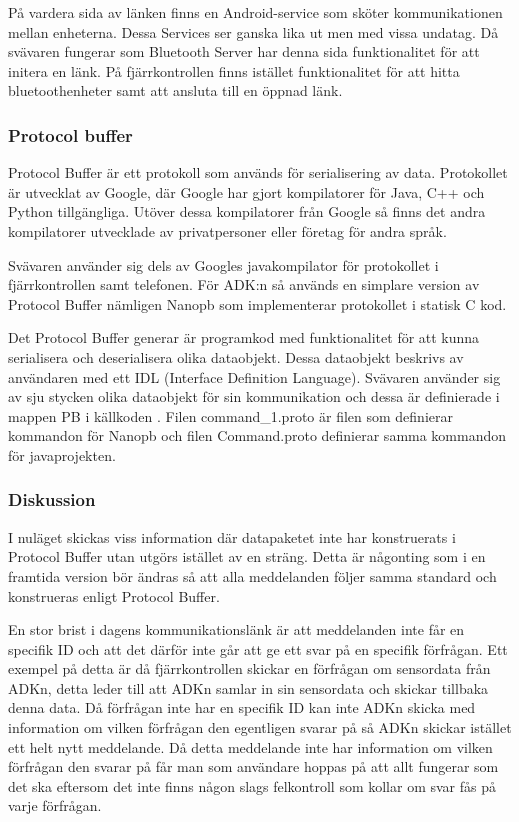 På vardera sida av länken finns en Android-service som sköter kommunikationen
mellan enheterna. Dessa Services ser ganska lika ut men med vissa undatag. Då
svävaren fungerar som Bluetooth Server har denna sida funktionalitet för att
initera en länk. På fjärrkontrollen finns istället funktionalitet för att hitta
bluetoothenheter samt att ansluta till en öppnad länk.


\subsubsection{Protocol buffer}
\label{komlank:ProtocolBuffer}
Protocol Buffer\cite{Protocol buffer} är ett protokoll som används för
serialisering av data.
Protokollet är utvecklat av Google, där Google har gjort kompilatorer för Java,
C++ och Python tillgängliga. Utöver dessa kompilatorer från Google så finns det
andra kompilatorer utvecklade av privatpersoner eller företag för andra språk.

Svävaren använder sig dels av Googles javakompilator för protokollet i 
fjärrkontrollen samt telefonen. För ADK:n så används en simplare version av
Protocol Buffer nämligen Nanopb \cite{Nanopb} som implementerar protokollet i
statisk C kod.

Det Protocol Buffer generar är programkod med funktionalitet för att kunna
serialisera och deserialisera olika dataobjekt. Dessa dataobjekt beskrivs av
användaren med ett IDL (Interface Definition Language).
Svävaren använder sig av sju stycken olika dataobjekt för sin kommunikation och
dessa är definierade i mappen PB i källkoden \cite{Source code}. Filen
command\_1.proto är filen som definierar kommandon för Nanopb och filen
Command.proto definierar samma kommandon för javaprojekten.

\subsubsection{Diskussion}
I nuläget skickas viss information där datapaketet inte har konstruerats i Protocol Buffer utan utgörs istället av 
en sträng. Detta är någonting som i en framtida version bör ändras så att alla meddelanden följer samma standard och 
konstrueras enligt Protocol Buffer. 

En stor brist i dagens kommunikationslänk är att meddelanden inte får en specifik ID och 
att det därför inte går att ge ett svar på en specifik förfrågan. Ett exempel på detta är då fjärrkontrollen skickar en 
förfrågan om sensordata från ADKn, detta leder till att ADKn samlar in sin sensordata och skickar tillbaka denna data. 
Då förfrågan inte har en specifik ID kan inte ADKn skicka med information om vilken förfrågan den egentligen svarar på 
så ADKn skickar istället ett helt nytt meddelande. Då detta meddelande inte har information om vilken förfrågan den svarar 
på får man som användare hoppas på att allt fungerar som det ska eftersom det inte finns någon slags felkontroll som kollar 
om svar fås på varje förfrågan.
